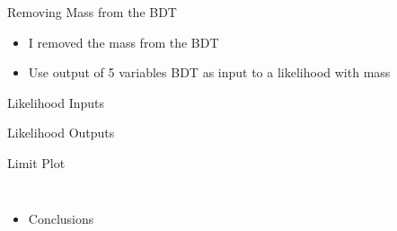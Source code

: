 \documentclass[t]{beamer}
\begin{document}
\begin{frame}{Removing Mass from the BDT}
 \begin{itemize}  
   \item I removed the mass from the BDT
   \item Use output of 5 variables BDT as input to a likelihood with mass
 \end{itemize}
\end{frame}

\begin{frame}{Likelihood Inputs}
\end{frame}

\begin{frame}{Likelihood Outputs}
\end{frame}

\begin{frame}{Limit Plot}
  \begin{columns}[c]
   \begin{itemize}  
     \item Conclusions
   \end{itemize}
  \end{columns}
\end{frame}
\end{document}
